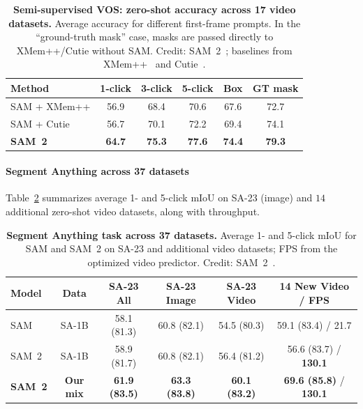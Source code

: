 \begin{enrichment}
\begin{enrichment}
		\begin{table}[H]
			\centering
			\scriptsize
			\caption{\textbf{Semi-supervised VOS: zero-shot accuracy across 17 video datasets.} Average accuracy for different first-frame prompts. In the ``ground-truth mask'' case, masks are passed directly to XMem++/Cutie without SAM. Credit: SAM~2~\cite{ravi2024_sam2}; baselines from XMem++~\cite{bekuzarov2023_xmempp} and Cutie~\cite{cheng2024_cutie}.}
			\label{tab:chapter15_sam2_vos}
			\begin{tabular}{lccccc}
				\toprule
				\textbf{Method} & \textbf{1-click} & \textbf{3-click} & \textbf{5-click} & \textbf{Box} & \textbf{GT mask} \\
				\midrule
				SAM + XMem++ & 56.9 & 68.4 & 70.6 & 67.6 & 72.7 \\
				SAM + Cutie  & 56.7 & 70.1 & 72.2 & 69.4 & 74.1 \\
				\textbf{SAM~2} & \textbf{64.7} & \textbf{75.3} & \textbf{77.6} & \textbf{74.4} & \textbf{79.3} \\
				\bottomrule
			\end{tabular}
		\end{table}
		
		\paragraph{Segment Anything across 37 datasets}
		Table~\ref{tab:chapter15_sam2_sa37} summarizes average 1- and 5-click mIoU on SA-23 (image) and $14$ additional zero-shot video datasets, along with throughput.
		
		\begin{table}[H]
			\centering
			\scriptsize
			\caption{\textbf{Segment Anything task across 37 datasets.} Average 1- and 5-click mIoU for SAM and SAM~2 on SA-23 and additional video datasets; FPS from the optimized video predictor. Credit: SAM~2~\cite{ravi2024_sam2}.}
			\label{tab:chapter15_sam2_sa37}
			\begin{tabular}{lccccc}
				\toprule
				\textbf{Model} & \textbf{Data} & \textbf{SA-23 All} & \textbf{SA-23 Image} & \textbf{SA-23 Video} & \textbf{14 New Video / FPS} \\
				\midrule
				SAM & SA-1B & 58.1 (81.3) & 60.8 (82.1) & 54.5 (80.3) & 59.1 (83.4) / 21.7 \\
				SAM~2 & SA-1B & 58.9 (81.7) & 60.8 (82.1) & 56.4 (81.2) & 56.6 (83.7) / \textbf{130.1} \\
				\textbf{SAM~2} & \textbf{Our mix} & \textbf{61.9 (83.5)} & \textbf{63.3 (83.8)} & \textbf{60.1 (83.2)} & \textbf{69.6 (85.8)} / \textbf{130.1} \\
				\bottomrule
			\end{tabular}
		\end{table}
		

\end{enrichment}
\end{enrichment}
